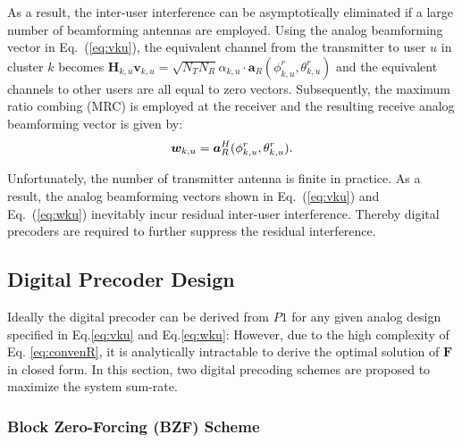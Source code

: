 \documentclass[conference]{IEEEtran}
\begin{document}
{As a result, the inter-user interference can be asymptotically eliminated if a large number of beamforming antennas are employed. Using the analog beamforming vector in Eq.~(\ref{eq:vku}), the equivalent channel from the transmitter to user $u$ in cluster $k$ becomes $\bm{H}_{k,u}\bm{v}_{k,u}=\sqrt{N_{T}N_{R}}\alpha_{k,u}\cdot \bm{a}_{R}(\phi^r_{k,u},\theta^r_{k,u})$ and the equivalent channels to other users are all equal to zero vectors. Subsequently, the maximum ratio combing (MRC) is employed at the receiver and the resulting receive analog beamforming vector is given by:
\begin{equation}
\bm{w}_{k,u}=\bm{a}_{R}^{H}(\phi^r_{k,u},\theta^r_{k,u}).\\
\label{eq:wku}
\end{equation}

Unfortunately, the number of transmitter antenna is finite in practice. As a result, the analog beamforming vectors shown in Eq.~(\ref{eq:vku}) and Eq.~(\ref{eq:wku}) inevitably incur residual inter-user interference. Thereby digital precoders are required to further suppress the residual interference.

\subsection{Digital Precoder Design}\label{digital}
Ideally the digital precoder can be derived from $P1$ for any given analog design specified in Eq.\eqref{eq:vku} and Eq.\eqref{eq:wku}:
However, due to the high complexity of Eq. \eqref{eq:convenR}, it is analytically intractable to derive the optimal solution of $\bm F$ in closed form. In this section, two digital precoding schemes are proposed to maximize the system sum-rate.

\subsubsection{Block Zero-Forcing (BZF) Scheme}

}
\end{document}
